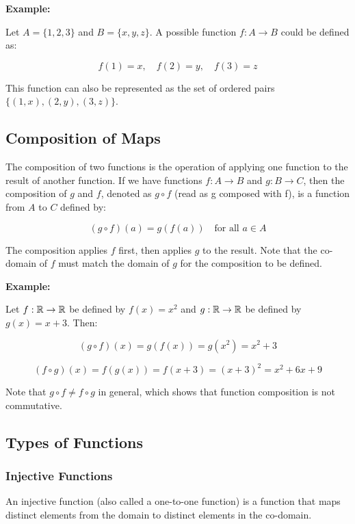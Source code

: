 \textbf{Example:}
\vspace{\baselineskip}

Let \(A = \{1, 2, 3\}\) and \(B = \{x, y, z\}\). A possible function \(f: A \to B\) could be defined as:

\[
	f(1) = x, \quad f(2) = y, \quad f(3) = z
\]

This function can also be represented as the set of ordered pairs \(\{(1,x), (2,y), (3,z)\}\).

\subsection{Composition of Maps}

The composition of two functions is the operation of applying one function to the result of another function. If we have functions 
\(f: A \to B\) and \(g: B \rightarrow C\), then the composition of \(g\) and \(f\), denoted as \(g \circ f\) (read as g composed with f), is a function from \(A\) to \(C\) defined by:

\[
	(g \circ f)(a) = g(f(a)) \quad \text{for all } a \in A
\]

The composition applies \(f\) first, then applies \(g\) to the result. 
Note that the co-domain of \(f\) must match the domain of \(g\) for the composition to be defined.
\vspace{\baselineskip}

\textbf{Example:}
\vspace{\baselineskip}

Let \(f: \mathbb{R} \to \mathbb{R}\) be defined by \(f(x) = x^2\) and \(g: \mathbb{R} \rightarrow \mathbb{R}\) be defined by \(g(x) = x+3\). Then:

\[
	(g \circ f)(x) = g(f(x)) = g(x^2) = x^2 + 3
\]

\[
	(f \circ g)(x) = f(g(x)) = f(x+3) = {(x+3)}^2 = x^2 + 6x + 9
\]

Note that \(g \circ f \neq f \circ g\) in general, which shows that function composition is not commutative.

\subsection{Types of Functions}

\subsubsection{Injective Functions}

An injective function (also called a one-to-one function) is a 
function that maps distinct elements from the domain to distinct elements in the co-domain.

